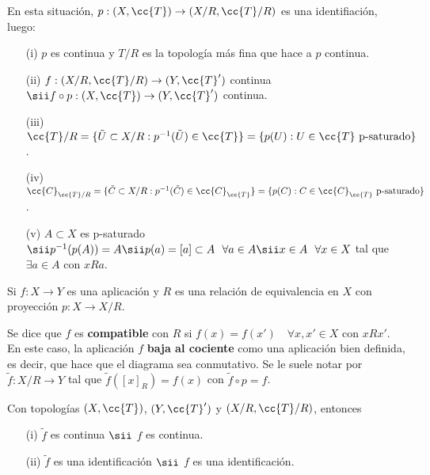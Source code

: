 \begin{propiedades}
    En esta situación, $p:(X, \cc{T})\to (X/R, \cc{T}/R)$ es una identifiación, luego:
    \begin{enumerate}
        \item[(i)] $p$ es continua y $T/R$ es la topología más fina que hace a $p$ continua.
        \item[(ii)] $f:(X/R, \cc{T}/R)\to (Y, \cc{T}')$ continua $\sii f\circ p:(X, \cc{T})\to (Y, \cc{T}')$ continua.
        \item[(iii)] $\cc{T}/R=\{\tilde{U}\subset X/R : p^{-1}(\tilde{U})\in \cc{T}\} = \{p(U) : U\in \cc{T} \text{ p-saturado}\}$.
        \item[(iv)] $\cc{C}_{\cc{T}/R} = \{\tilde{C}\subset X/R : p^{-1}(\tilde{C})\in \cc{C}_{\cc{T}}\} = \{p(C) : C\in \cc{C}_{\cc{T}} \text{ p-saturado}\}$.
        \item[(v)] $A\subset X$ es p-saturado $\sii p^{-1}(p(A))=A \sii p(a)=[a]\subset A\ \ \forall a \in A \sii x\in A\ \ \forall x\in X$ tal que $\exists a \in A$ con $xRa$.
    \end{enumerate}
    \endsquare
\end{propiedades}

\begin{definicion}
    Si $f:X \to Y$ es una aplicación y $R$ es una relación de equivalencia en $X$ con proyección $p:X \to X/R$.

    \begin{figure}[H]
        \centering
    \end{figure}
    

    Se dice que $f$ es \textbf{compatible} con $R$ si $f(x)=f(x')$\ \ $\forall x, x' \in X$ con $xRx'$. En este caso, la aplicación $f$ \textbf{baja al cociente} como una aplicación bien definida, es decir, que hace que el diagrama sea conmutativo. Se le suele notar por $\tilde{f}:X/R \to Y$ tal que $\tilde{f}([x]_R)=f(x)$ con $\tilde{f}\circ p = f$.
    \endsquare
\end{definicion}

\begin{coro}
    Con topologías $(X, \cc{T})$, $(Y, \cc{T}')$ y $(X/R, \cc{T}/R)$, entonces 
    \begin{enumerate}
        \item[(i)] $\tilde{f}$ es continua $\sii$ $f$ es continua.
        \item[(ii)] $\tilde{f}$ es una identificación $\sii$ $f$ es una identificación.
    \end{enumerate}
    \endsquare
\end{coro}

